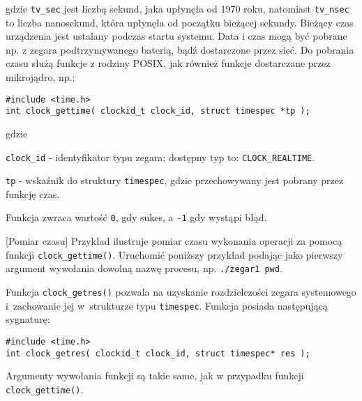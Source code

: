 \noindent
gdzie \lstinline[style=MyCStyle]{tv_sec} jest liczbą sekund, jaka upłynęła od 1970 roku, natomiast \lstinline[style=MyCStyle]{tv_nsec} to liczba nanosekund, która upłynęła od początku bieżącej sekundy. Bieżący czas urządzenia jest ustalany podczas startu systemu. Data i czas mogą być pobrane np. z zegara podtrzymywanego baterią, bądź dostarczone przez sieć. Do pobrania czasu służą funkcje z rodziny POSIX, jak również funkcje dostarczane przez mikrojądro, np.:

\begin{lstlisting}[style=MyCStyle]
#include <time.h>
int clock_gettime( clockid_t clock_id, struct timespec *tp );
\end{lstlisting}

\noindent
gdzie

\begin{myitemize}
\item[] \lstinline[style=MyCStyle]{clock_id} - identyfikator typu zegara; dostępny typ to: \lstinline[style=MyCStyle]{CLOCK_REALTIME}.
\item[] \lstinline[style=MyCStyle]{tp} - wskaźnik do struktury \lstinline[style=MyCStyle]{timespec}, gdzie przechowywany jest pobrany przez funkcję czas.
\end{myitemize}

Funkcja zwraca wartość \lstinline[style=MyCStyle]{0}, gdy sukes, a \lstinline[style=MyCStyle]{-1} gdy wystąpi błąd.


\begin{example}{[Pomiar czasu]} Przykład ilustruje pomiar czasu wykonania operacji  za pomocą funkcji \lstinline[style=MyCStyle]{clock_gettime()}. Uruchomić poniższy przykład podając jako pierwszy argument wywołania dowolną nazwę procesu, np. \lstinline[style=MyCStyle]{./zegar1 pwd}.

\end{example}

Funkcja \lstinline[style=MyCStyle]{clock_getres()} pozwala na uzyskanie rozdzielczości zegara systemowego i~zachowanie jej w~strukturze typu \lstinline[style=MyCStyle]{timespec}. Funkcja posiada następującą sygnaturę:

\begin{lstlisting}[style=MyCStyle]
#include <time.h>
int clock_getres( clockid_t clock_id, struct timespec* res );
\end{lstlisting}

Argumenty wywołania funkcji są takie same, jak w przypadku funkcji \lstinline[style=MyCStyle]{clock_gettime()}.

